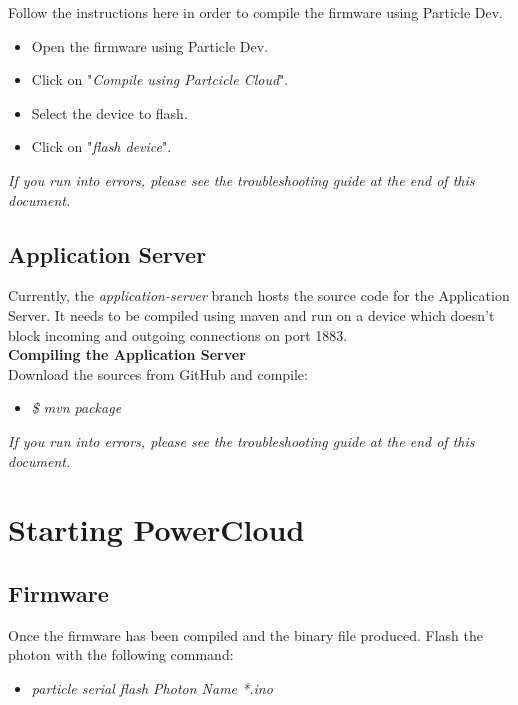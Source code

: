 \documentclass[a4paper,10pt]{article}
\begin{document}
			Follow the instructions here in order to compile the firmware using Particle Dev.
			\\
			\begin{itemize}
				\item Open the firmware using Particle Dev.
				\item Click on "\textit{Compile using Partcicle Cloud}".
				\item Select the device to flash.
				\item Click on "\textit{flash device}".
			\end{itemize}
			
			\textit{If you run into errors, please see the troubleshooting guide at the end of this document.}
			
		\subsection{Application Server}
			Currently, the \textit{application-server} branch hosts the source code for the Application Server. It needs to be compiled using maven and run on a device which doesn't block incoming and outgoing connections on port 1883.\\
			
			\textbf{Compiling the Application Server}\\
			Download the sources from GitHub and compile:\\
			
			\begin{itemize}
				\item \textit{\$ mvn package}
			\end{itemize}		
				
			\textit{If you run into errors, please see the troubleshooting guide at the end of this document.}
			
			\newpage
	\section{Starting PowerCloud}
		\subsection{Firmware}
			Once the firmware has been compiled and the binary file produced. Flash the photon with the following command:
			
			\begin{itemize}
				\item \textit{particle serial flash Photon Name *.ino}
			\end{itemize}
			
\end{document}
